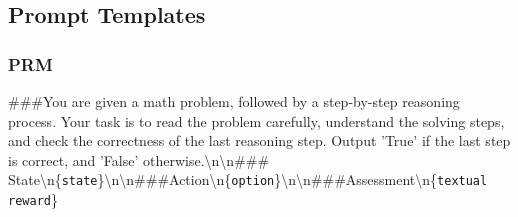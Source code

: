 


\subsection{Prompt Templates}
\label{app:prompt}
\subsubsection{PRM}
\begin{tcolorbox}[label=prm_prompt]
\#\#\#You are given a math problem, followed by a step-by-step reasoning process. Your task is to read the problem carefully, understand the solving steps, and check the correctness of the last reasoning step. Output 'True' if the last step is correct, and 'False' otherwise.\textbackslash n\textbackslash n\#\#\# State\textbackslash n\{\texttt{state}\}\textbackslash n\textbackslash n\#\#\#Action\textbackslash n\{\texttt{option}\}\textbackslash n\textbackslash n\#\#\#Assessment\textbackslash n\{\texttt{textual reward}\}
\end{tcolorbox}

